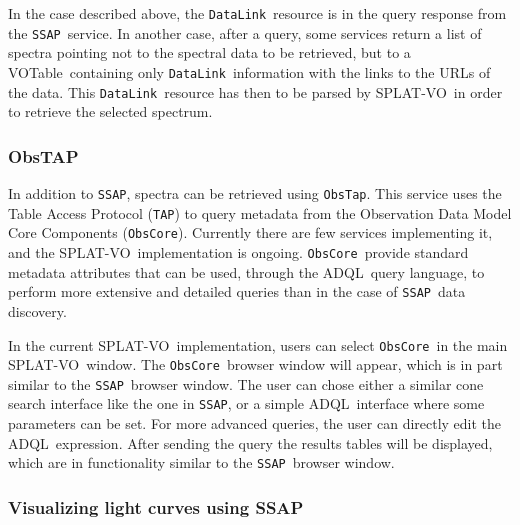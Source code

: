 \documentclass[final,authoryear,5p,times,twocolumn]{elsarticle}
\newcommand{\datalink}{\texttt{DataLink}}
\newcommand{\ssap}{\texttt{SSAP}}
\newcommand{\obstap}{\texttt{ObsTap}}
\newcommand{\tap}{\texttt{TAP}}
\newcommand{\obscore}{\texttt{ObsCore}}
\newcommand{\votable}{VOTable}
\newcommand{\adql}{ADQL}
\newcommand{\splatvo}{{\textsf{\small{SPLAT-VO}}}}
\begin{document}
In the case described above, the \datalink\ resource is in the query response
from the \ssap\ service. In another case, after a query, some services return a
list of spectra pointing not to the spectral data to be retrieved, but to a
\votable\ containing only \datalink\ information with the links to the URLs of
the data. This \datalink\ resource has then to be parsed by \splatvo\ in order
to retrieve the selected spectrum.

\subsubsection{ObsTAP}

In addition to \ssap, spectra can be retrieved using \obstap. This service uses
the Table Access Protocol (\tap) to query metadata from the Observation Data
Model Core Components (\obscore). Currently there are few services implementing
it, and the \splatvo\ implementation is ongoing.  \obscore\ provide standard
metadata attributes that can be used, through the \adql\ query language, to
perform more extensive and detailed queries than in the case of \ssap\ data
discovery.

In the current \splatvo\ implementation, users can select \obscore\ in the main
\splatvo\ window. The \obscore\ browser window will appear, which is in part
similar to the \ssap\ browser window. The user can chose either a similar cone
search interface like the one in \ssap, or a simple \adql\ interface where some
parameters can be set. For more advanced queries, the user can directly edit
the \adql\ expression. After sending the query the results tables will be
displayed, which are in functionality similar to the \ssap\ browser window.

\subsubsection{Visualizing light curves using SSAP}
\end{document}
